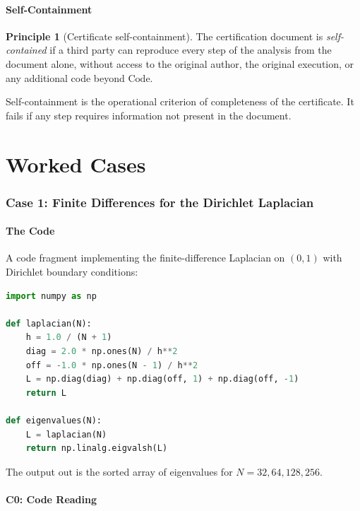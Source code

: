 \documentclass[11pt,a4paper]{article}
\theoremstyle{definition}
\newtheorem{principle}[definition]{Principle}
\theoremstyle{plain}
\begin{document}
\subsection{Self-Containment}

\begin{principle}[Certificate self-containment]\label{pr:self-contained}
The certification document is \emph{self-contained} if a third
party can reproduce every step of the analysis from the document
alone, without access to the original author, the original
execution, or any additional code beyond $\mathrm{Code}$.
\end{principle}

Self-containment is the operational criterion of completeness of
the certificate. It fails if any step requires information not
present in the document.

\part{Worked Cases}
\label{part:cases}

\section{Case 1: Finite Differences for the Dirichlet Laplacian}
\label{sec:case-closed}

\subsection{The Code}

A code fragment implementing the finite-difference Laplacian on
$(0,1)$ with Dirichlet boundary conditions:

\begin{lstlisting}[language=Python]
import numpy as np

def laplacian(N):
    h = 1.0 / (N + 1)
    diag = 2.0 * np.ones(N) / h**2
    off = -1.0 * np.ones(N - 1) / h**2
    L = np.diag(diag) + np.diag(off, 1) + np.diag(off, -1)
    return L

def eigenvalues(N):
    L = laplacian(N)
    return np.linalg.eigvalsh(L)
\end{lstlisting}

The output $\mathrm{out}$ is the sorted array of eigenvalues for
$N = 32, 64, 128, 256$.

\subsection{C0: Code Reading}
\end{document}

